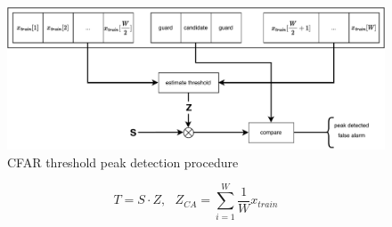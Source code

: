 \begin{figure}[!h]
	\includegraphics[width=\linewidth]{images/peakdet}
	
	\caption{CFAR threshold peak detection procedure \cite{rohling11}}
	\label{fig:simsig}
\end{figure}

\begin{equation}
	T=S\cdot Z,~~~Z_{CA}=\sum_{i=1}^{W}\dfrac{1}{W}x_{train}
\end{equation}
%
%
